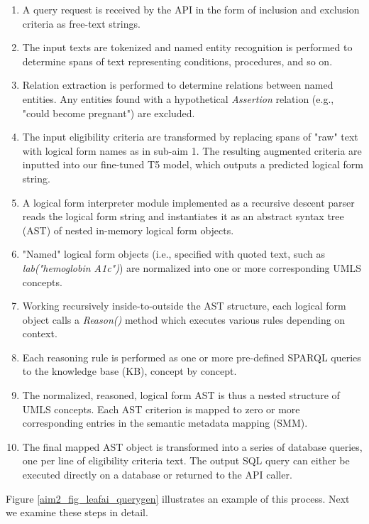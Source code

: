 \documentclass[../main.tex]{subfiles}
\begin{document}
\begin{enumerate}
    \item{A query request is received by the API in the form of inclusion and exclusion criteria as free-text strings.}
    \item{The input texts are tokenized and named entity recognition is performed to determine spans of text representing conditions, procedures, and so on.}
    \item{Relation extraction is performed to determine relations between named entities. Any entities found with a hypothetical \textit{Assertion} relation (e.g., "could become pregnant") are excluded.}
    \item{The input eligibility criteria are transformed by replacing spans of "raw" text with logical form names as in sub-aim 1. The resulting augmented criteria are inputted into our fine-tuned T5 model, which outputs a predicted logical form string.}
    \item{A logical form interpreter module implemented as a recursive descent parser \cite{johnstone1998generalised} reads the logical form string and instantiates it as an abstract syntax tree (AST) of nested in-memory logical form objects.}
    \item{"Named" logical form objects (i.e., specified with quoted text, such as \textit{lab("hemoglobin A1c")}) are normalized into one or more corresponding UMLS concepts.}
    \item{Working recursively inside-to-outside the AST structure, each logical form object calls a \textit{Reason()} method which executes various rules depending on context.}
    \item{Each reasoning rule is performed as one or more pre-defined SPARQL queries to the knowledge base (KB), concept by concept.}
    \item{The normalized, reasoned, logical form AST is thus a nested structure of UMLS concepts. Each AST criterion is mapped to zero or more corresponding entries in the semantic metadata mapping (SMM).}
    \item{The final mapped AST object is transformed into a series of database queries, one per line of eligibility criteria text. The output SQL query can either be executed directly on a database or returned to the API caller.}
\end{enumerate}

\noindent Figure \ref{aim2_fig_leafai_querygen} illustrates an example of this process. Next we examine these steps in detail. \\
\end{document}
